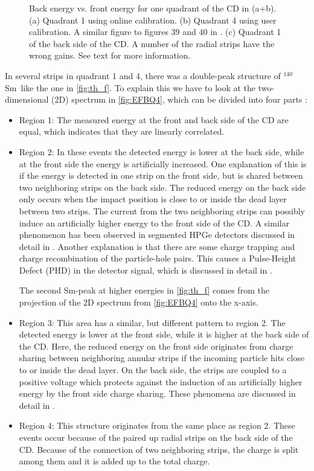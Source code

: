 \documentclass[twoside,english]{uiofysmaster/uiofysmaster}
\newcommand{\Sm}{$^{140}$Sm} %
\let\orgautoref\autoref
\renewcommand{\autoref}
        {%
		 \def\sectionautorefname{Section}%
		 \def\subsectionautorefname{Section}%
		 \def\subsubsectionautorefname{Section}%
		 \def\chapterautorefname{Chapter}%
          \orgautoref}
\begin{document}
\begin{figure}[htb]
\begin{subfigure}[t]{0.49\textwidth}
		\caption{}
		\label{fig:CD_cal_back}
	\end{subfigure}
	\caption{Back energy vs. front energy for one quadrant of the CD in (a+b). 
	(a) Quadrant 1 using online calibration.
	(b) Quadrant 4 using user calibration. A similar figure to figures 39 and 40 in \cite{Rosiak}.
	(c) Quadrant 1 of the back side of the CD. A number of the radial strips have the wrong gains.
	See text for more information.}
	\label{fig:FBE}
\end{figure}

In several strips in quadrant 1 and 4, there was a double-peak structure of \Sm\ like the one in \autoref{fig:th_f}. 
To explain this we have to look at the two-dimensional (2D) spectrum in \autoref{fig:EFBQ4}, which can be divided into four parts \cite{Rosiak}:
\begin{itemize}
	\item Region 1: The measured energy at the front and back side of the CD are equal, which indicates that they are linearly correlated.
	\item Region 2: In these events the detected energy is lower at the back side, while at the front side the energy is artificially increased. 
	One explanation of this is if the energy is detected in one strip on the front side, but is shared between two neighboring strips on the back side.
	The reduced energy on the back side only occurs when the impact position is close to or inside the dead layer between two strips. 
	The current from the two neighboring strips can possibly induce an artificially higher energy to the front side of the CD. 
	A similar phenomenon has been observed in segmented HPGe detectors discussed in detail in \cite{Bruyneel2006a, Bruyneel2006b, Bruyneel, Descovich2005, Abt2017}.	
	Another explanation is that there are some charge trapping and charge recombination of the particle-hole pairs. 
	This causes a Pulse-Height Defect (PHD) in the detector signal, which is discussed in detail in \cite{Miller1962, Wilkins1971}.
	
	The second Sm-peak at higher energies in \autoref{fig:th_f} comes from the projection of the 2D spectrum from \autoref{fig:EFBQ4} onto the x-axis.
	\item Region 3: This area has a similar, but different pattern to region 2. 
	The detected energy is lower at the front side, while it is higher at the back side of the CD. 
	Here, the reduced energy on the front side originates from charge sharing between neighboring annular strips if the incoming particle hits close to or inside the dead layer. 
	 On the back side, the strips are coupled to a positive voltage which protects against the induction of an artificially higher energy by the front side charge sharing. 
	These phenomena are discussed in detail in \cite{Grassi2014, Kramberger2002}.
	\item Region 4: This structure originates from the same place as region 2.
	These events occur because of the paired up radial strips on the back side of the CD.  
	Because of the connection of two neighboring strips, the charge is split among them and it is added up to the total charge.
\end{itemize}
\end{document}
